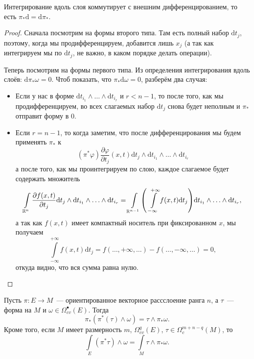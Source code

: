  	 	\begin{theorem} 
 	 		Интегрирование вдоль слоя коммутирует с внешним дифференцированием, то есть $\pi_* \mathrm{d} = \mathrm{d}\pi_*$.
 	 	\end{theorem}
 	 	\begin{proof}
 	 		Сначала посмотрим на формы второго типа. Там есть полный набор $\mathrm{d}t_j$, поэтому, когда мы продифференцируем, добавится лишь $x_j$ (а так как интегрируем мы по $\mathrm{d}t_j$, не важно, в каком порядке делать операции). 

 	 		Теперь посмотрим на формы первого типа. Из определения интегрирования вдоль слоёв: $\mathrm{d} \pi_* \omega = 0$. Чтоб показать, что $\pi_* \mathrm{d}\omega = 0$, разберём два случая: 
 	 		\begin{itemize}
 	 			\item Если у нас в форме $\mathrm{d}t_{i_1} \wedge \ldots \wedge \mathrm{d}t_{i_{r}}$ и $r < n - 1$, то после того, как мы продифференцируем, во всех слагаемых набор $\mathrm{d}t_j$ снова будет неполным и $\pi_*$ отправит форму в 0. 

 	 			\item Если $r = n - 1$, то когда заметим, что после дифференцирования мы будем применять $\pi_*$ к 
 	 			\[
 	 				(\pi^*\varphi) \frac{\partial \varphi}{\partial t_j}(x, t) \mathrm{d}t_j \wedge \mathrm{d}t_{i_1} \wedge \ldots \wedge \mathrm{d}t_{i_{r}}
 	 			\] 
 	 			а после того, как мы проинтегрируем по слою, каждое слагаемое будет содержать множитель
 	 			\[
 	 				\int\limits_{\R^{n}}  \frac{\partial f(x, t)}{\partial t_j} \mathrm{d}t_j \wedge \mathrm{d}t_{i_1} \wedge \ldots \wedge \mathrm{d}t_{i_{r}} = \int\limits_{\R^{n - 1}} \lr*{\ \int\limits_{-\infty}^{+\infty} f(x, t) \mathrm{d} t_j} \mathrm{d}t_{i_1} \wedge \ldots \wedge \mathrm{d}t_{i_{r}},
 	 			\]
 	 			а так как $f(x, t)$ имеет компактный носитель при фиксированном $x$, мы получаем 
 	 			\[
 	 				\int\limits_{-\infty}^{+\infty} f(x, t) \mathrm{d} t_j = f(\ldots, + \infty, \ldots) - f(\ldots, -\infty, \ldots) = 0,	
 	 			\]
 	 			откуда видно, что вся сумма равна нулю. 
 	 		\end{itemize}
 	 	\end{proof}

 	 	\begin{theorem} 
 	 		Пусть $\pi\colon E \to M$~--- ориентированное векторное рассслоение ранга $n$, а $\tau$~--- форма на $M$ и $\omega \in \Omega_{cv}^{\bullet}(E)$. Тогда 
 	 		\[
 	 			\pi_*(\pi^*(\tau) \wedge \omega) = \tau \wedge \pi_* \omega. 
 	 		\]
 	 		Кроме того, если $M$ имеет размерность $m$, $\Omega_{cv}^{q}(E)$, $\tau \in \Omega_{c}^{m + n - q}(M)$, то 
 	 		\[
 	 			\int\limits_{E} (\pi^* \tau) \wedge \omega = \int\limits_{M} \tau \wedge \pi_* \omega. 
 	 		\]
 	 	\end{theorem}

